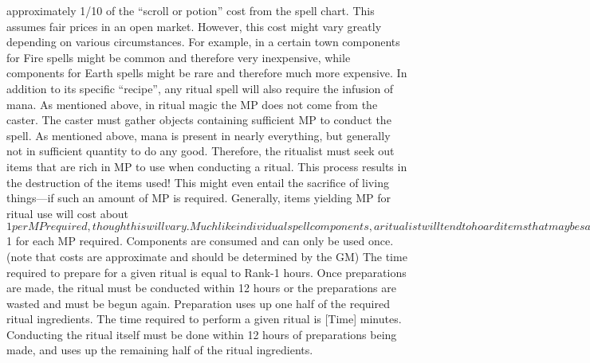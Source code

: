 \documentclass[twoside]{book}
\begin{document}
               approximately 1/10 of the “scroll or potion”
               cost from the spell chart. This assumes fair prices in an
               open market. However, this cost might vary greatly
               depending on various circumstances. For example, in a
               certain town components for Fire spells might be common
               and therefore very inexpensive, while components for Earth
               spells might be rare and therefore much more expensive.
                 In addition to its specific “recipe”,
               any ritual spell will also require the infusion of mana.
               As mentioned above, in ritual magic the MP does not come
               from the caster. The caster must gather objects containing
               sufficient MP to conduct the spell. As mentioned above,
               mana is present in nearly everything, but generally not in
               sufficient quantity to do any good. Therefore, the
               ritualist must seek out items that are rich in MP to use
               when conducting a ritual. This process results in the
               destruction of the items used! This might even entail the
               sacrifice of living things—if such an amount of MP
               is required. Generally, items yielding MP for ritual use
               will cost about $1 per MP required, though this will vary.
               Much like individual spell components, a ritualist will
               tend to hoard items that may be sacrificed for MP. Common
               items are living plants and small animals, antiques, old
               artwork, fossils, old holy items, old clothing (especially
               from special occasions) and well-used household goods.
               MP-source items are not spell-dependant. MP items can be
               used for ANY spell.   
                  NO MP from the character are required for ritual
                 magic 
                  Each spell’s components cost 1/10th of the
                 “scroll/potion” cost from the spell table,
                 PLUS $1 for each MP required. Components are consumed
                 and can only be used once. (note that costs are
                 approximate and should be determined by the GM) 
                  The time required to prepare for a given ritual
                 is equal to Rank-1 hours. Once preparations are made,
                 the ritual must be conducted within 12 hours or the
                 preparations are wasted and must be begun again.
                 Preparation uses up one half of the required ritual
                 ingredients. 
                  The time required to perform a given ritual is
                 [Time] minutes. Conducting the ritual itself must be
                 done within 12 hours of preparations being made, and
                 uses up the remaining half of the ritual ingredients.
                 
\end{document}
